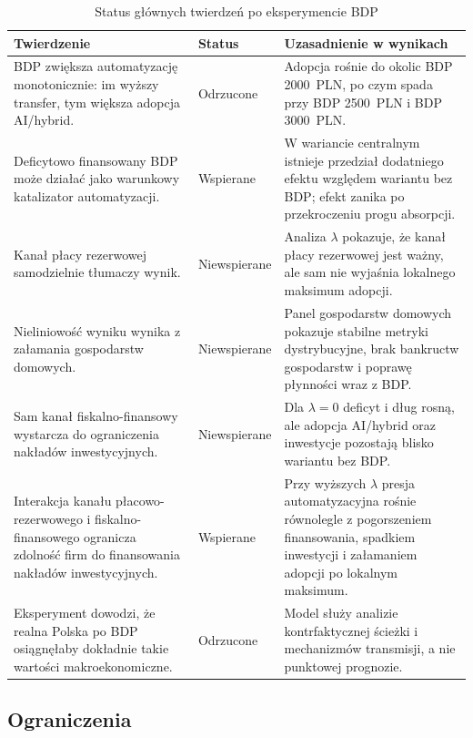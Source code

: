 \begin{table}[htbp]
\centering
\scriptsize
\caption{Status głównych twierdzeń po eksperymencie BDP}
\label{tab:claim-status}
\begin{tabularx}{\textwidth}{@{}>{\raggedright\arraybackslash}p{}>{\raggedright\arraybackslash}p{}>{\raggedright\arraybackslash}X@{}}
\toprule
\textbf{Twierdzenie} & \textbf{Status} & \textbf{Uzasadnienie w wynikach} \\
\midrule
BDP zwiększa automatyzację monotonicznie: im wyższy transfer, tym większa adopcja AI/hybrid. &
Odrzucone &
Adopcja rośnie do okolic BDP 2000~PLN, po czym spada przy BDP 2500~PLN i BDP 3000~PLN. \\
\addlinespace
Deficytowo finansowany BDP może działać jako warunkowy katalizator automatyzacji. &
Wspierane &
W wariancie centralnym istnieje przedział dodatniego efektu względem wariantu bez BDP; efekt zanika po przekroczeniu progu absorpcji. \\
\addlinespace
Kanał płacy rezerwowej samodzielnie tłumaczy wynik. &
Niewspierane &
Analiza \(\lambda\) pokazuje, że kanał płacy rezerwowej jest ważny, ale sam nie wyjaśnia lokalnego maksimum adopcji. \\
\addlinespace
Nieliniowość wyniku wynika z załamania gospodarstw domowych. &
Niewspierane &
Panel gospodarstw domowych pokazuje stabilne metryki dystrybucyjne, brak bankructw gospodarstw i poprawę płynności wraz z BDP. \\
\addlinespace
Sam kanał fiskalno-finansowy wystarcza do ograniczenia nakładów inwestycyjnych. &
Niewspierane &
Dla \(\lambda = 0\) deficyt i dług rosną, ale adopcja AI/hybrid oraz inwestycje pozostają blisko wariantu bez BDP. \\
\addlinespace
Interakcja kanału płacowo-rezerwowego i fiskalno-finansowego ogranicza zdolność firm do finansowania nakładów inwestycyjnych. &
Wspierane &
Przy wyższych \(\lambda\) presja automatyzacyjna rośnie równolegle z pogorszeniem finansowania, spadkiem inwestycji i załamaniem adopcji po lokalnym maksimum. \\
\addlinespace
Eksperyment dowodzi, że realna Polska po BDP osiągnęłaby dokładnie takie wartości makroekonomiczne. &
Odrzucone &
Model służy analizie kontrfaktycznej ścieżki i mechanizmów transmisji, a nie punktowej prognozie. \\
\bottomrule
\end{tabularx}
\end{table}

\subsection{Ograniczenia}

